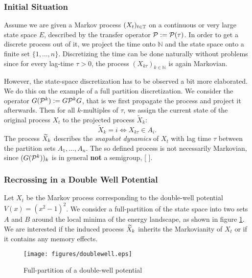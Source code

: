 
\subsubsection*{Initial Situation}

Assume we are given a Markov process $(X_t)_{t\in\mathbb{T}}$ on a continuous or very large state space $E$, described by the transfer operator $\mathcal{P} := \mathcal{P}(\tau)$.
In order to get a discrete process out of it, we project the time onto $\mathbb{N}$ and the state space onto a finite set $\{1,\dots,n\}$.
Discretizing the time can be done naturally without problems since for every lag-time $\tau > 0$, the process $(X_{k\tau})_{k\in \mathbb{N}}$ is again Markovian. 

However, the state-space discretization has to be observed a bit more elaborated.
We do this on the example of a full partition discretization.
We consider the operator $G(\mathcal{P}^k) := G\mathcal{P}^k G$, that is we first propagate the process and project it afterwards.
Then for all $k$-multiples of $\tau$, we assign the current state of the original process $X_t$ to the projected process $\widetilde{X}_k$:
\begin{equation*}
\widetilde{X}_k = i \Leftrightarrow X_{k\tau} \in A_i.
\end{equation*}
The process $\widetilde{X}_k$ describes the \textit{snapshot dynamics} of $X_t$ with lag time $\tau$ between the partition sets $A_1,\dots,A_n$.
The so defined process is not necessarily Markovian, since $(G(\mathcal{P}^k))_k$ is in general \textbf{not} a semigroup, [ ]. 

\subsubsection*{Recrossing in a Double Well Potential}

Let $X_t$ be the Markov process corresponding to the double-well potential $V(x) = (x^2-1)^2$. We consider a full-partition of the state space into two sets $A$ and $B$ around the local minima of the energy landscape, as shown in figure \ref{fig:doublewell}.
We are interested if the induced process $\widetilde{X}_k$ inherits the Markovianity of $X_t$ or if it contains any memory effects.
\begin{figure}[!ht]
	\centering
	\texttt{[image: figures/doublewell.eps]} %
	\caption{Full-partition of a double-well potential}
	\label{fig:doublewell}
\end{figure}


